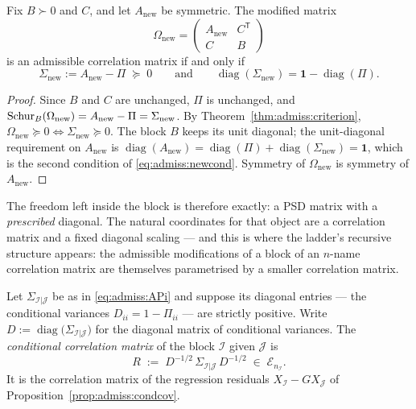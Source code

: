 \begin{theorem}\label{thm:admiss:blockmod}
Fix $B \succ 0$ and $C$, and let $A_{\mathrm{new}}$ be symmetric. The
modified matrix
\[
  \Omega_{\mathrm{new}}
  = \begin{pmatrix} A_{\mathrm{new}} & C^{\mathsf T} \\ C & B \end{pmatrix}
\]
is an admissible correlation matrix if and only if
\begin{equation}\label{eq:admiss:newcond}
  \Sigma_{\mathrm{new}} := A_{\mathrm{new}} - \Pi \;\succeq\; 0
  \qquad\text{and}\qquad
  \operatorname{diag}(\Sigma_{\mathrm{new}}) = \mathbf{1} -
  \operatorname{diag}(\Pi) .
\end{equation}
\end{theorem}

\begin{proof}
Since $B$ and $C$ are unchanged, $\Pi$ is unchanged, and
$\mathrm{Schur}_{B}\!\left(\Omega_{\mathrm{new}}\right) = A_{\mathrm{new}} - \Pi =
\Sigma_{\mathrm{new}}$. By Theorem~\ref{thm:admiss:criterion},
$\Omega_{\mathrm{new}} \succeq 0 \iff \Sigma_{\mathrm{new}} \succeq 0$.
The block $B$ keeps its unit diagonal; the unit-diagonal requirement on
$A_{\mathrm{new}}$ is
$\operatorname{diag}(A_{\mathrm{new}}) = \operatorname{diag}(\Pi) +
\operatorname{diag}(\Sigma_{\mathrm{new}}) = \mathbf{1}$, which is the
second condition of \eqref{eq:admiss:newcond}. Symmetry of
$\Omega_{\mathrm{new}}$ is symmetry of $A_{\mathrm{new}}$.
\end{proof}

The freedom left inside the block is therefore exactly: a PSD matrix with a
\emph{prescribed} diagonal. The natural coordinates for that object are a
correlation matrix and a fixed diagonal scaling --- and this is where the
ladder's recursive structure appears: the admissible modifications of a
block of an $n$-name correlation matrix are themselves parametrised by a
smaller correlation matrix.

\begin{definition}\label{def:admiss:condcorr}
Let $\Sigma_{\mathcal I|\mathcal J}$ be as in \eqref{eq:admiss:APi} and
suppose its diagonal entries --- the conditional variances
$D_{ii} = 1 - \Pi_{ii}$ --- are strictly positive. Write
$D := \operatorname{diag}\bigl(\Sigma_{\mathcal I|\mathcal J}\bigr)$ for the
diagonal matrix of conditional variances. The \emph{conditional correlation
matrix} of the block $\mathcal I$ given $\mathcal J$ is
\begin{equation}\label{eq:admiss:R}
  R \;:=\; D^{-1/2}\, \Sigma_{\mathcal I|\mathcal J}\, D^{-1/2}
  \;\in\; \mathcal{E}_{n_{\mathcal I}} .
\end{equation}
It is the correlation matrix of the regression residuals
$X_{\mathcal I} - G X_{\mathcal J}$ of
Proposition~\ref{prop:admiss:condcov}.
\end{definition}

